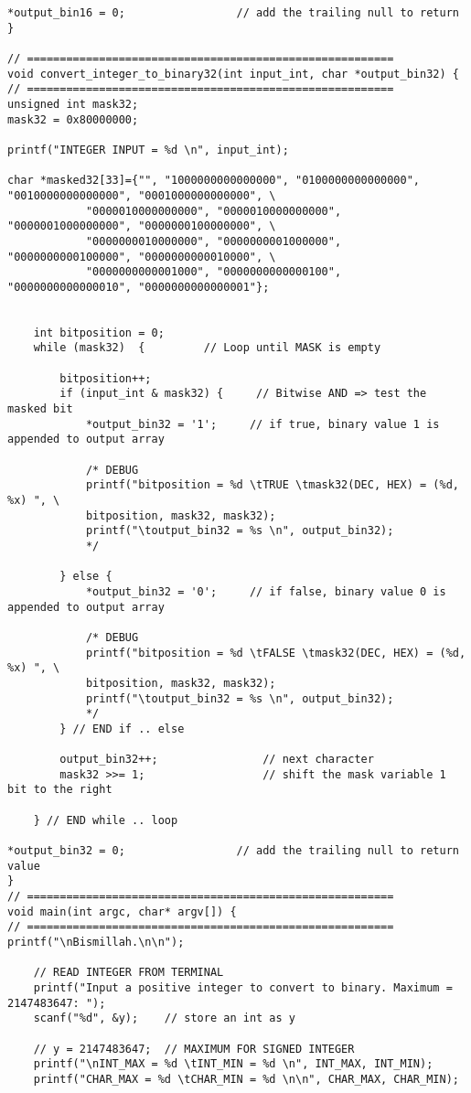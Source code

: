 \begin{lstlisting}[caption={App4-Converting-software-codes-to-binary-bits-pulses}, label=App4-Converting-software-codes-to-binary-bits-pulses]
	*output_bin16 = 0;                 // add the trailing null to return
} 

// ========================================================
void convert_integer_to_binary32(int input_int, char *output_bin32) {
// ========================================================
unsigned int mask32;      
mask32 = 0x80000000;    

printf("INTEGER INPUT = %d \n", input_int);

char *masked32[33]={"", "1000000000000000", "0100000000000000", "0010000000000000", "0001000000000000", \
			"0000010000000000", "0000010000000000", "0000001000000000", "0000000100000000", \
			"0000000010000000", "0000000001000000", "0000000000100000", "0000000000010000", \
			"0000000000001000", "0000000000000100", "0000000000000010", "0000000000000001"};


	int bitposition = 0;    
	while (mask32)  {         // Loop until MASK is empty

		bitposition++;
		if (input_int & mask32) {     // Bitwise AND => test the masked bit
			*output_bin32 = '1';     // if true, binary value 1 is appended to output array

			/* DEBUG               
			printf("bitposition = %d \tTRUE \tmask32(DEC, HEX) = (%d, %x) ", \
			bitposition, mask32, mask32);
			printf("\toutput_bin32 = %s \n", output_bin32);
			*/
			
		} else {
			*output_bin32 = '0';     // if false, binary value 0 is appended to output array
			
			/* DEBUG
			printf("bitposition = %d \tFALSE \tmask32(DEC, HEX) = (%d, %x) ", \
			bitposition, mask32, mask32);
			printf("\toutput_bin32 = %s \n", output_bin32);
			*/
		} // END if .. else

		output_bin32++;                // next character
		mask32 >>= 1;                  // shift the mask variable 1 bit to the right
		
	} // END while .. loop
	
*output_bin32 = 0;                 // add the trailing null to return value
}
// ========================================================
void main(int argc, char* argv[]) {
// ========================================================
printf("\nBismillah.\n\n");

	// READ INTEGER FROM TERMINAL
	printf("Input a positive integer to convert to binary. Maximum = 2147483647: ");
	scanf("%d", &y);  	// store an int as y

	// y = 2147483647;  // MAXIMUM FOR SIGNED INTEGER
	printf("\nINT_MAX = %d \tINT_MIN = %d \n", INT_MAX, INT_MIN);
	printf("CHAR_MAX = %d \tCHAR_MIN = %d \n\n", CHAR_MAX, CHAR_MIN);


\end{lstlisting}
